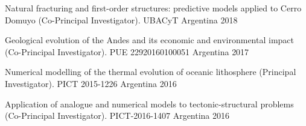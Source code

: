 \begin{cvhonors}
\cvhonor
    {Natural fracturing and first-order structures: predictive models applied to Cerro Domuyo (Co-Principal Investigator).}
    {UBACyT}
    {Argentina}
    {2018}

\cvhonor
    {Geological evolution of the Andes and its economic and environmental impact (Co-Principal Investigator).}
    {PUE 22920160100051}
    {Argentina}
    {2017}

\cvhonor
    {Numerical modelling of the thermal evolution of oceanic lithosphere (Principal Investigator).}
    {PICT 2015-1226}
    {Argentina}
    {2016}

\cvhonor
    {Application of analogue and numerical models to tectonic-structural problems (Co-Principal Investigator).}
    {PICT-2016-1407}
    {Argentina}
    {2016}

\end{cvhonors}
\endgroup
